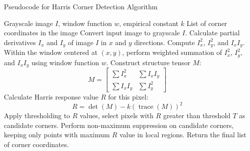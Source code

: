 \begin{algorithm}[H]
    \caption{Pseudocode for Harris Corner Detection Algorithm}
    \begin{algorithmic}[1]
    \Require Grayscale image \(I\), window function \(w\), empirical constant \(k\)
    \Ensure List of corner coordinates in the image
    \State Convert input image to grayscale \(I\).
    \State Calculate partial derivatives \(I_x\) and \(I_y\) of image \(I\) in \(x\) and \(y\) directions.
    \State Compute \(I_x^2\), \(I_y^2\), and \(I_x I_y\).
        \State Within the window centered at \((x,y)\), perform weighted summation of \(I_x^2\), \(I_y^2\), and \(I_x I_y\) using window function \(w\).
        \State Construct structure tensor \(M\):
        \[ M = \begin{bmatrix} \sum I_x^2 & \sum I_x I_y \\ \sum I_x I_y & \sum I_y^2 \end{bmatrix} \]
        \State Calculate Harris response value \(R\) for this pixel:
        \[ R = \det(M) - k (\operatorname{trace}(M))^2 \]
    \EndFor
    \State Apply thresholding to \(R\) values, select pixels with \(R\) greater than threshold \(T\) as candidate corners.
    \State Perform non-maximum suppression on candidate corners, keeping only points with maximum \(R\) value in local regions.
    \State Return the final list of corner coordinates.
    \end{algorithmic}
\end{algorithm}